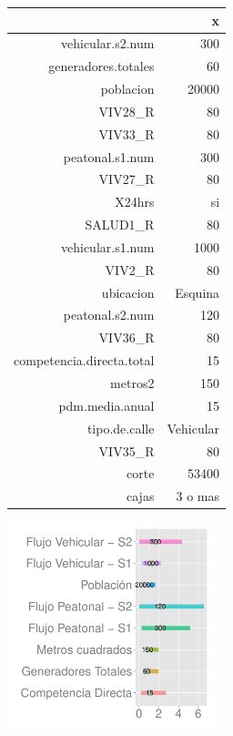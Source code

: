 \documentclass{article}\usepackage[]{graphicx}\usepackage[]{color}
\newenvironment{knitrout}{}{} %
\begin{document}
\begin{minipage}[b]{0.5\linewidth}
\begin{tabular}{r|r}
  \hline
 & x \\ 
  \hline
vehicular.s2.num & 300 \\ 
  generadores.totales & 60 \\ 
  poblacion & 20000 \\ 
  VIV28\_R & 80 \\ 
  VIV33\_R & 80 \\ 
  peatonal.s1.num & 300 \\ 
  VIV27\_R & 80 \\ 
  X24hrs & si \\ 
  SALUD1\_R & 80 \\ 
  vehicular.s1.num & 1000 \\ 
  VIV2\_R & 80 \\ 
  ubicacion & Esquina \\ 
  peatonal.s2.num & 120 \\ 
  VIV36\_R & 80 \\ 
  competencia.directa.total & 15 \\ 
  metros2 & 150 \\ 
  pdm.media.anual & 15 \\ 
  tipo.de.calle & Vehicular \\ 
  VIV35\_R & 80 \\ 
  corte & 53400 \\ 
  cajas & 3 o mas  \\ 
   \hline
\end{tabular}


\end{minipage}
\begin{minipage}[b]{0.3\linewidth}
\begin{knitrout}
\color{fgcolor}
\includegraphics[width=6cm]{figure/unnamed-chunk-3} 

\end{knitrout}

\end{minipage}
\end{document}
